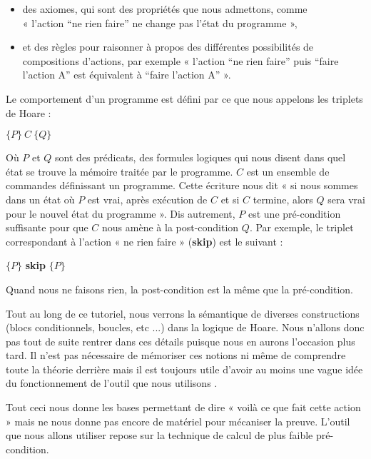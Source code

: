 \begin{itemize}
\item des axiomes, qui sont des propriétés que nous admettons, comme \\
« l'action “ne rien faire” ne change pas l'état du programme »,
\item et des règles pour raisonner à propos des différentes possibilités de 
compositions d'actions, par exemple « l'action “ne rien faire” puis “faire 
l'action A” est équivalent à “faire l'action A” ».
\end{itemize}


Le comportement d'un programme est défini par ce que nous appelons les triplets
de Hoare :




\begin{center}
$\{P\}\ C\ \{Q\}$
\end{center}


Où $P$ et $Q$ sont des prédicats, des formules logiques qui nous disent dans 
quel état se trouve la mémoire traitée par le programme. $C$ est un ensemble de
commandes définissant un programme. Cette écriture nous dit « si nous sommes 
dans un état où $P$ est vrai, après exécution de $C$ et si $C$ termine, 
alors $Q$ sera vrai pour le nouvel état du programme ». Dis autrement, $P$ est 
une pré-condition suffisante pour que $C$ nous amène à la post-condition $Q$. 
Par exemple, le triplet correspondant à l'action « ne rien faire » (\textbf{skip}) 
est le suivant :




\begin{center}
$\{P\}$ \textbf{skip} $\{P\}$
\end{center}


Quand nous ne faisons rien, la post-condition est la même que la pré-condition.



Tout au long de ce tutoriel, nous verrons la sémantique de diverses 
constructions (blocs conditionnels, boucles, etc ...) dans la logique de Hoare.
Nous n'allons donc pas tout de suite rentrer dans ces détails puisque nous en
aurons l'occasion plus tard. Il n'est pas nécessaire de mémoriser ces notions
ni même de comprendre toute la théorie derrière mais il est toujours utile
d'avoir au moins une vague idée du fonctionnement de l'outil que nous
utilisons  .



Tout ceci nous donne les bases permettant de dire « voilà ce que fait cette 
action » mais ne nous donne pas encore de matériel pour mécaniser la preuve. 
L'outil que nous allons utiliser repose sur la technique de calcul de plus 
faible pré-condition.



